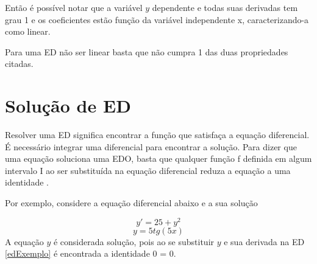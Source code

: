 Então é possível notar que a variável $y$ dependente e todas suas derivadas tem grau 1 e os coeficientes estão função da variável independente x, caracterizando-a como linear.

Para uma ED não ser linear basta que não cumpra 1 das duas propriedades citadas.

\section[Solução de ED]{Solução de ED}

Resolver uma ED significa encontrar a função que satisfaça a equação diferencial. É necessário integrar uma diferencial para encontrar a solução.
Para dizer que uma equação soluciona uma EDO, basta que qualquer função f definida em algum intervalo I ao ser substituída na equação diferencial reduza a equação a uma identidade \cite{explicacaoEDO}.

\begin{flushleft}
Por exemplo, considere a equação diferencial abaixo e a sua solução 
\end{flushleft}

\begin{equation} \label{edExemplo} y' = 25 + y^2 \end{equation}  \begin{equation} y = 5tg(5x) \end{equation} A equação $y$ é considerada solução, pois ao se substituir $y$ e sua derivada na ED \ref{edExemplo} é encontrada a identidade 0 = 0.

